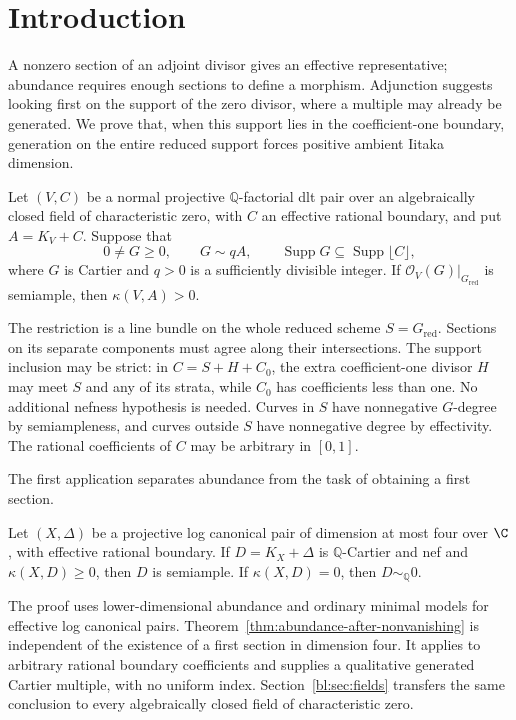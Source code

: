 \section{Introduction}
\label{bl:sec:introduction}

A nonzero section of an adjoint divisor gives an effective representative;
abundance requires enough sections to define a morphism. Adjunction
suggests looking first on the support of the zero divisor, where a
multiple may already be generated. We prove that, when this support lies
in the coefficient-one boundary, generation on the entire reduced support
forces positive ambient Iitaka dimension.

\begin{theorem}\label{bl:thm:supported}
Let $(V,C)$ be a normal projective $\mathbb Q$-factorial dlt pair over an
algebraically closed field of characteristic zero, with $C$ an effective
rational boundary, and put $A=K_V+C$. Suppose that
\[
  0\ne G\geq0,\qquad G\sim qA,\qquad
  \operatorname{Supp}G\subseteq\operatorname{Supp}\lfloor C\rfloor,
\]
where $G$ is Cartier and $q>0$ is a sufficiently divisible integer.
If $\mathcal O_V(G)|_{G_{\mathrm{red}}}$ is semiample, then
$\kappa(V,A)>0$.
\end{theorem}

The restriction is a line bundle on the whole reduced scheme
$S=G_{\mathrm{red}}$. Sections on its separate components must agree
along their intersections. The support inclusion may be strict: in
$C=S+H+C_0$, the extra coefficient-one divisor $H$ may meet $S$ and
any of its strata, while $C_0$ has coefficients less than one.
No additional nefness hypothesis is needed. Curves in $S$ have
nonnegative $G$-degree by semiampleness, and curves outside $S$ have
nonnegative degree by effectivity. The rational coefficients of $C$
may be arbitrary in $[0,1]$.

The first application separates abundance from the task of obtaining a
first section.
\begin{theorem}
\label{thm:abundance-after-nonvanishing}
Let $(X,\Delta)$ be a projective log canonical pair of dimension at most
four over $\C$, with
effective rational boundary. If $D=K_X+\Delta$ is $\mathbb Q$-Cartier
and nef and $\kappa(X,D)\geq0$, then $D$ is semiample. If
$\kappa(X,D)=0$, then $D\sim_{\mathbb Q}0$.
\end{theorem}

The proof uses lower-dimensional abundance and ordinary minimal models
for effective log canonical pairs. Theorem~\ref{thm:abundance-after-nonvanishing}
is independent of the existence of a first section in dimension four.
It applies to arbitrary rational boundary coefficients and supplies a
qualitative generated Cartier multiple, with no uniform index.
Section~\ref{bl:sec:fields} transfers the same conclusion to every
algebraically closed field of characteristic zero.

